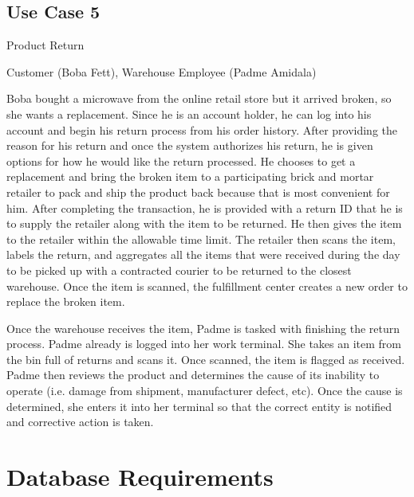 \documentclass{article}
\let\oldsection\section
\renewcommand\section{\clearpage\oldsection}
\begin{document}
\subsection{Use Case 5}
\begin{description}[font=\bfseries\itshape]
\item[Title:]Product Return
\item[Actors:]Customer (Boba Fett), Warehouse Employee (Padme Amidala)
\item[Description:]Boba bought a microwave from the online retail store but it arrived broken, so she wants a replacement.  Since he is an account holder, he can log into his account and begin his return process from his order history.  After providing the reason for his return and once the system authorizes his return, he is given options for how he would like the return processed.  He chooses to get a replacement and bring the broken item to a participating brick and mortar retailer to pack and ship the product back because that is most convenient for him.  After completing the transaction, he is provided with a return ID that he is to supply the retailer along with the item to be returned.  He then gives the item to the retailer within the allowable time limit.  The retailer then scans the item, labels the return, and aggregates all the items that were received during the day to be picked up with a contracted courier to be returned to the closest warehouse.  Once the item is scanned, the fulfillment center creates a new order to replace the broken item.

\hspace*{2em}Once the warehouse receives the item, Padme is tasked with finishing the return process.  Padme already is logged into her work terminal.  She takes an item from the bin full of returns and scans it.  Once scanned, the item is flagged as received.  Padme then reviews the product and determines the cause of its inability to operate (i.e. damage from shipment, manufacturer defect, etc).  Once the cause is determined, she enters it into her terminal so that the correct entity is notified and corrective action is taken.
\end{description}

\section{Database Requirements}
\end{document}
